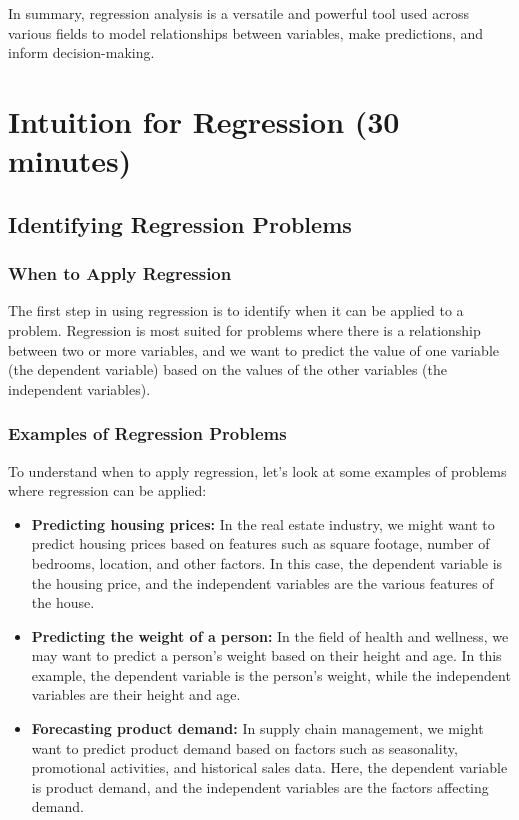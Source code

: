 \documentclass{beamer}
\begin{document}
In summary, regression analysis is a versatile and powerful tool used across various fields to model relationships between variables, make predictions, and inform decision-making.

\section{Intuition for Regression (30 minutes)}
\subsection{Identifying Regression Problems}

\subsubsection{When to Apply Regression}

The first step in using regression is to identify when it can be applied to a problem. Regression is most suited for problems where there is a relationship between two or more variables, and we want to predict the value of one variable (the dependent variable) based on the values of the other variables (the independent variables).

\subsubsection{Examples of Regression Problems}

To understand when to apply regression, let's look at some examples of problems where regression can be applied:

\begin{itemize}
\item \textbf{Predicting housing prices:} In the real estate industry, we might want to predict housing prices based on features such as square footage, number of bedrooms, location, and other factors. In this case, the dependent variable is the housing price, and the independent variables are the various features of the house.
\item \textbf{Predicting the weight of a person:} In the field of health and wellness, we may want to predict a person's weight based on their height and age. In this example, the dependent variable is the person's weight, while the independent variables are their height and age.
\item \textbf{Forecasting product demand:} In supply chain management, we might want to predict product demand based on factors such as seasonality, promotional activities, and historical sales data. Here, the dependent variable is product demand, and the independent variables are the factors affecting demand.
\end{itemize}
\end{document}
